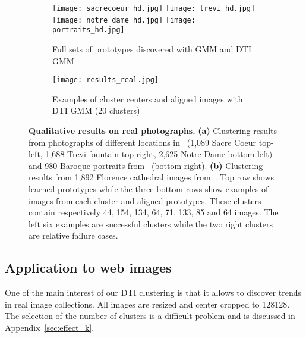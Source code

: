 \documentclass{article}
\begin{document}
\begin{figure}
    \centering
    \begin{subfigure}{\columnwidth}
      \centering
      \texttt{[image: sacrecoeur\_hd.jpg]}\enspace\thinspace\thinspace
      \texttt{[image: trevi\_hd.jpg]}\\
      \vspace{0.2em}
      \texttt{[image: notre\_dame\_hd.jpg]}\enspace\thinspace\thinspace
      \texttt{[image: portraits\_hd.jpg]}
      \caption{Full sets of prototypes discovered with GMM and DTI GMM}
    \end{subfigure}
    \begin{subfigure}{\columnwidth}
      \centering
      \vspace{0.1em}
      \texttt{[image: results\_real.jpg]}
      \caption{Examples of cluster centers and aligned images with DTI GMM (20 clusters)}
    \label{fig:flo}
    \end{subfigure}
      \caption{\textbf{Qualitative results on real photographs.} \textbf{(a)} Clustering 
        results from photographs of different locations in~\cite{li2018megadepth} (1,089 
        Sacre Coeur top-left, 1,688 Trevi fountain top-right, 2,625 Notre-Dame bottom-left) 
        and 980 Baroque portraits from~\cite{karayev2013recognizing} (bottom-right).  
        \textbf{(b)} Clustering results from 1,892 Florence cathedral images 
        from~\cite{li2018megadepth}.  Top row shows learned prototypes while the three bottom 
        rows show examples of images from each cluster and aligned prototypes. These clusters 
        contain respectively 44, 154, 134, 64, 71, 133, 85 and 64 images.  The left six 
      examples are successful clusters while the two right clusters are relative failure 
    cases.}
    \label{fig:real}
    \vspace{-1em}
\end{figure}

\subsection{Application to web images}
 
One of the main interest of our DTI clustering is that it allows to discover trends in real 
image collections. All images are resized and center cropped to 128128. The selection 
of the number of clusters is a difficult problem and is discussed in 
Appendix~\ref{sec:effect_k}.
\end{document}
